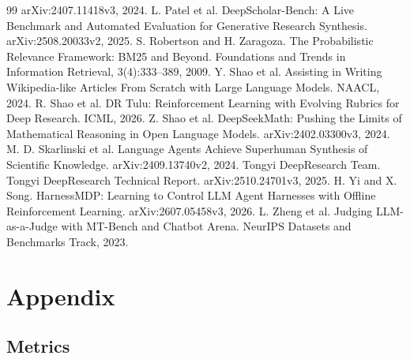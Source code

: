\documentclass[11pt, letterpaper]{article}
\begin{document}
\begin{thebibliography}{99}
arXiv:2407.11418v3, 2024.
L. Patel et al. DeepScholar-Bench: A Live Benchmark and Automated Evaluation for Generative Research
Synthesis. arXiv:2508.20033v2, 2025.
S. Robertson and H. Zaragoza. The Probabilistic Relevance Framework: BM25 and Beyond. Foundations
and Trends in Information Retrieval, 3(4):333--389, 2009.
Y. Shao et al. Assisting in Writing Wikipedia-like Articles From Scratch with Large Language
Models. NAACL, 2024.
R. Shao et al. DR Tulu: Reinforcement Learning with Evolving Rubrics for Deep Research. ICML, 2026.
Z. Shao et al. DeepSeekMath: Pushing the Limits of Mathematical Reasoning in Open Language Models.
arXiv:2402.03300v3, 2024.
M. D. Skarlinski et al. Language Agents Achieve Superhuman Synthesis of Scientific Knowledge.
arXiv:2409.13740v2, 2024.
Tongyi DeepResearch Team. Tongyi DeepResearch Technical Report. arXiv:2510.24701v3, 2025.
H. Yi and X. Song. HarnessMDP: Learning to Control LLM Agent Harnesses with Offline Reinforcement
Learning. arXiv:2607.05458v3, 2026.
L. Zheng et al. Judging LLM-as-a-Judge with MT-Bench and Chatbot Arena. NeurIPS Datasets and
Benchmarks Track, 2023.
\end{thebibliography}

\clearpage
\appendix
\section*{Appendix}
\renewcommand{\thesubsection}{\Alph{subsection}}

\subsection{Metrics}
\label{app:metrics}
\end{document}
